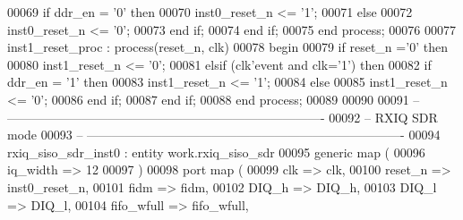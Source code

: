 \begin{DoxyCode}
00069       \textcolor{keywordflow}{if} \textcolor{vhdlchar}{ddr_en} \textcolor{vhdlchar}{=} \textcolor{vhdlchar}{'}\textcolor{vhdllogic}{}\textcolor{vhdllogic}{0}\textcolor{vhdlchar}{'} \textcolor{keywordflow}{then} 
00070          inst0\_reset\_n <= '1';
00071       \textcolor{keywordflow}{else} 
00072          inst0\_reset\_n <= '0';
00073       \textcolor{keywordflow}{end} \textcolor{keywordflow}{if};
00074    \textcolor{keywordflow}{end} \textcolor{keywordflow}{if};
00075 \textcolor{keywordflow}{end} \textcolor{keywordflow}{process};
00076 
00077 inst1\_reset\_proc : \textcolor{keywordflow}{process}(reset_n, clk)
00078 \textcolor{vhdlkeyword}{begin}
00079    \textcolor{keywordflow}{if} \textcolor{vhdlchar}{reset_n} \textcolor{vhdlchar}{=}\textcolor{vhdlchar}{'}\textcolor{vhdllogic}{}\textcolor{vhdllogic}{0}\textcolor{vhdlchar}{'} \textcolor{keywordflow}{then} 
00080       inst1\_reset\_n <= '0';
00081    \textcolor{keywordflow}{elsif} \textcolor{vhdlchar}{(}\textcolor{vhdlchar}{clk}\textcolor{vhdlchar}{'}\textcolor{vhdlkeyword}{event} \textcolor{keywordflow}{and} \textcolor{vhdlchar}{clk}\textcolor{vhdlchar}{=}\textcolor{vhdlchar}{'}\textcolor{vhdllogic}{}\textcolor{vhdllogic}{1}\textcolor{vhdlchar}{'}\textcolor{vhdlchar}{)} \textcolor{keywordflow}{then} 
00082       \textcolor{keywordflow}{if} \textcolor{vhdlchar}{ddr_en} \textcolor{vhdlchar}{=} \textcolor{vhdlchar}{'}\textcolor{vhdllogic}{}\textcolor{vhdllogic}{1}\textcolor{vhdlchar}{'} \textcolor{keywordflow}{then} 
00083          inst1\_reset\_n <= '1';
00084       \textcolor{keywordflow}{else} 
00085          inst1\_reset\_n <= '0';
00086       \textcolor{keywordflow}{end} \textcolor{keywordflow}{if};
00087    \textcolor{keywordflow}{end} \textcolor{keywordflow}{if};
00088 \textcolor{keywordflow}{end} \textcolor{keywordflow}{process};
00089 
00090  
00091 \textcolor{keyword}{-- ----------------------------------------------------------------------------}
00092 \textcolor{keyword}{-- RXIQ SDR mode}
00093 \textcolor{keyword}{-- ----------------------------------------------------------------------------}
00094  rxiq\_siso\_sdr\_inst0 : \textcolor{keywordflow}{entity} work.rxiq_siso_sdr
00095    \textcolor{keywordflow}{generic} \textcolor{keywordflow}{map} (
00096       iq_width    => \textcolor{vhdllogic}{12}
00097    \textcolor{vhdlchar}{)}
00098    \textcolor{keywordflow}{port} \textcolor{keywordflow}{map} (
00099       clk         => clk,
00100       reset_n     => inst0_reset_n,
00101       fidm         => fidm,
00102       DIQ_h         => DIQ_h,
00103         DIQ_l          => DIQ_l,
00104       fifo_wfull  => fifo_wfull,

\end{DoxyCode}
